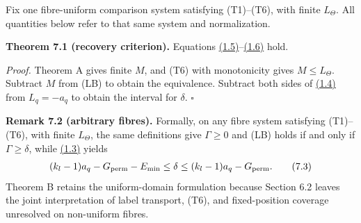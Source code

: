 \documentclass[11pt,a4paper]{amsart}
\begin{document}
Fix one fibre-uniform comparison system satisfying (T1)--(T6), with finite $L_\Theta$. All quantities below refer to that same system and normalization.


\par\smallskip\noindent\textbf{Theorem 7.1 (recovery criterion).} Equations \hyperref[eq:1.5]{(1.5)}--\hyperref[eq:1.6]{(1.6)} hold.


\emph{Proof.} Theorem A gives finite $M$, and (T6) with monotonicity gives $M\le L_\Theta$. Subtract $M$ from (LB) to obtain the equivalence. Subtract both sides of \hyperref[eq:1.4]{(1.4)} from $L_q=-a_q$ to obtain the interval for $\delta$. \hfill$\square$


\par\smallskip\noindent\textbf{Remark 7.2 (arbitrary fibres).} Formally, on any fibre system satisfying (T1)--(T6), with finite $L_\Theta$, the same definitions give $\Gamma\ge0$ and (LB) holds if and only if $\Gamma\ge\delta$, while \hyperref[eq:1.3]{(1.3)} yields
\begin{equation}
\begin{gathered}
(k_l-1)a_q-G_{\rm perm}-E_{\min}
\le\delta\le(k_l-1)a_q-G_{\rm perm}.
\end{gathered}
\tag{7.3}\label{eq:7.3}
\end{equation}
Theorem B retains the uniform-domain formulation because Section 6.2 leaves the joint interpretation of label transport, (T6), and fixed-position coverage unresolved on non-uniform fibres.
\end{document}
